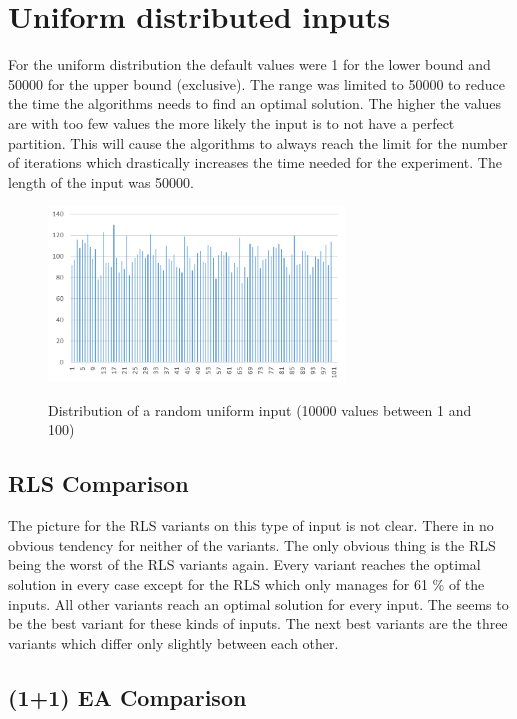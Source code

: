 \section{Uniform distributed inputs}
For the uniform distribution the default values were 1 for the lower bound and 50000 for the upper bound (exclusive).
The range was limited to 50000 to reduce the time the algorithms needs to find an optimal solution.
The higher the values are with too few values the more likely the input is to not have a perfect partition\cite{borgs2001phase}.
This will cause the algorithms to always reach the limit for the number of iterations which drastically increases the time needed for the experiment.
The length of the input was 50000.


\begin{figure}[h]
      \caption{Distribution of a random uniform input (10000 values between 1 and 100)}
      \centering
      \includegraphics[width=0.7\textwidth]{figures/images/numberGenerator/uniformDistributionMin1Max101n10000.png}\label{fig:uniDistExample}
\end{figure}
\subsection{RLS Comparison}


The picture for the RLS variants on this type of input is not clear.
There in no obvious tendency for neither of the variants.
The only obvious thing is the RLS being the worst of the RLS variants again.
Every variant reaches the optimal solution in every case except for the RLS which only manages for 61 \% of the inputs.
All other variants reach an optimal solution for every input.
The \RLSN[2] seems to be the best variant for these kinds of inputs.
The next best variants are the three \RLSR[s] variants which differ only slightly between each other.

\subsection{(1+1) EA Comparison}


